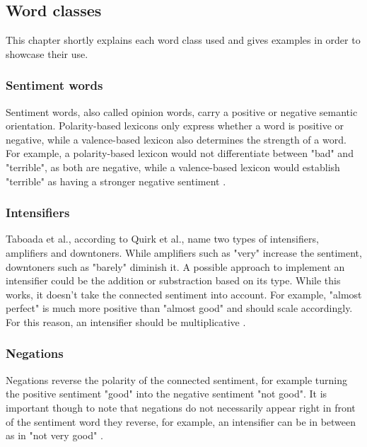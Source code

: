 \subsection{Word classes}
This chapter shortly explains each word class used and gives examples in order to showcase their use.

\subsubsection{Sentiment words}
Sentiment words, also called opinion words, carry a positive or negative semantic orientation. Polarity-based lexicons only express whether a word is positive or negative, while a valence-based lexicon also determines the strength of a word. For example, a polarity-based lexicon would not differentiate between "bad" and "terrible", as both are negative, while a valence-based lexicon would establish "terrible" as having a stronger negative sentiment \cite{DBLP:conf/icwsm/HuttoG14}.

\subsubsection{Intensifiers}

Taboada et al., according to Quirk et al., name two types of intensifiers, amplifiers and downtoners. While amplifiers such as "very" increase the  sentiment, downtoners such as "barely" diminish it. A possible approach to implement an intensifier could be the addition or substraction based on its type. While this works, it doesn't take the connected sentiment into account. For example, "almost perfect" is much more positive than "almost good" and should scale accordingly. For this reason, an intensifier should be multiplicative \cite{taboada}.

\subsubsection{Negations}
Negations reverse the polarity of the connected sentiment, for example turning the positive sentiment "good" into the negative sentiment "not good". It is important though to note that negations do not necessarily appear right in front of the sentiment word they reverse, for example, an intensifier can be in between as in "not very good" \cite{taboada}.


